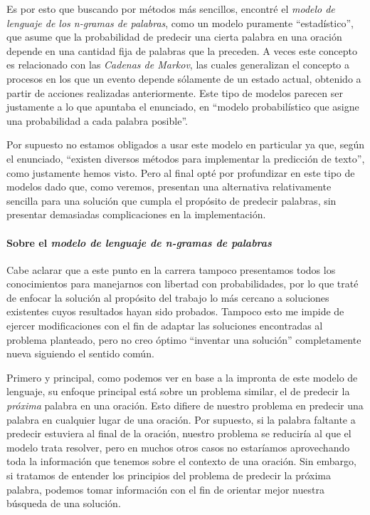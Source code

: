 \documentclass[a4paper]{article}
\begin{document}
Es por esto que buscando por métodos más sencillos, encontré el \textit{modelo de lenguaje de los n-gramas de palabras}, como un modelo puramente ``estadístico'', que asume que la probabilidad de predecir una cierta palabra en una oración depende en una cantidad fija de palabras que la preceden\cite{WikiNgramModel}. A veces este concepto es relacionado con las \textit{Cadenas de Markov}, las cuales generalizan el concepto a procesos en los que un evento depende sólamente de un estado actual, obtenido a partir de acciones realizadas anteriormente\cite{WikiMarkov}. Este tipo de modelos parecen ser justamente a lo que apuntaba el enunciado, en ``modelo probabilístico que asigne una probabilidad a cada palabra posible''.

Por supuesto no estamos obligados a usar este modelo en particular ya que, según el enunciado, ``existen diversos métodos para implementar la predicción de texto'', como justamente hemos visto. Pero al final opté por profundizar en este tipo de modelos dado que, como veremos, presentan una alternativa relativamente sencilla para una solución que cumpla el propósito de predecir palabras, sin presentar demasiadas complicaciones en la implementación.

\paragraph{Sobre el \textit{modelo de lenguaje de n-gramas de palabras}}

Cabe aclarar que a este punto en la carrera tampoco presentamos todos los conocimientos para manejarnos con libertad con probabilidades, por lo que traté de enfocar la solución al propósito del trabajo lo más cercano a soluciones existentes cuyos resultados hayan sido probados. Tampoco esto me impide de ejercer modificaciones con el fin de adaptar las soluciones encontradas al problema planteado, pero no creo óptimo ``inventar una solución'' completamente nueva siguiendo el sentido común. 

Primero y principal, como podemos ver en base a la impronta de este modelo de lenguaje, su enfoque principal está sobre un problema similar, el de predecir la \textit{próxima} palabra en una oración. Esto difiere de nuestro problema en predecir una palabra en cualquier lugar de una oración. Por supuesto, si la palabra faltante a predecir estuviera al final de la oración, nuestro problema se reduciría al que el modelo trata resolver, pero en muchos otros casos no estaríamos aprovechando toda la información que tenemos sobre el contexto de una oración. Sin embargo, si tratamos de entender los principios del problema de predecir la próxima palabra, podemos tomar información con el fin de orientar mejor nuestra búsqueda de una solución. \\
\end{document}
